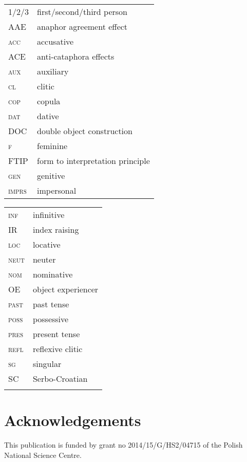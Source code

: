 \documentclass[output=paper,modfonts,nonflat
]{langsci/langscibook}
\begin{document}
\begin{tabularx}{.55\textwidth}{@{}lX@{}}
\textsc{1/2/3}&first/second/third person\\
AAE&anaphor agreement effect\\
\textsc{acc}&{accusative}\\
ACE&anti-cataphora effects\\
\textsc{aux}&auxiliary\\
\textsc{cl}&{clitic}\\
\textsc{cop}&{copula}\\
\textsc{dat}&{dative}\\
DOC&double object construction\\
\textsc{f}&feminine\\
FTIP&form to interpretation principle\\
\textsc{gen}&{genitive}\\
\textsc{imprs}&impersonal\\
\end{tabularx}%
\begin{tabularx}{.40\textwidth}{@{}lX@{}}
\textsc{inf}&{infinitive}\\
IR&index raising\\
\textsc{loc}&{locative}\\
\textsc{neut}&{neuter}\\
\textsc{nom}&{nominative}\\
OE&object experiencer\\
\textsc{past}&past tense\\
\textsc{poss}&possessive\\
\textsc{pres}&{present tense}\\
\textsc{refl}&{reflexive clitic}\\
\textsc{sg}&singular\\
SC&Serbo-Croatian\\
&\\
\end{tabularx}

\section*{Acknowledgements}
This publication is funded by grant no 2014/15/G/HS2/04715 of the Polish National Science Centre.

\sloppy
\printbibliography[heading=subbibliography,notkeyword=this]
\end{document}
